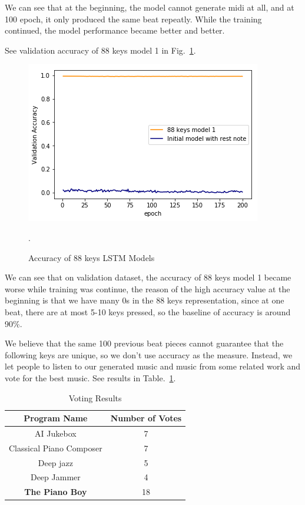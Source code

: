 \documentclass[conference]{IEEEtran}
\begin{document}
We can see that at the beginning, the model cannot generate midi at all, and at 100 epoch, it only produced the same beat repeatly. While the training continued, the model performance became better and better.

See validation accuracy of 88 keys model 1 in Fig.~\ref{fig5}.
\begin{figure}[htbp]
\centerline{\includegraphics[scale=0.5]{pics/compare5.png}}.
\caption{Accuracy of 88 keys LSTM Models}
\label{fig5}
\end{figure}

We can see that on validation dataset, the accuracy of 88 keys model 1 became worse while training was continue, the reason of the high accuracy value at the beginning is that we have many 0s in the 88 keys representation, since at one beat, there are at most 5-10 keys pressed, so the baseline of accuracy is around 90\%.

We believe that the same 100 previous beat pieces cannot guarantee that the following keys are unique, so we don't use accuracy as the measure. Instead, we let people to listen to our generated music and music from some related work and vote for the best music. See results in Table.~\ref{tab1}.

\begin{table}[htbp]
\caption{Voting Results}
\begin{center}
\begin{tabular}{|c|c|}
\hline
Program Name& Number of Votes\\
\hline
AI Jukebox& 7\\
Classical Piano Composer& 7\\
Deep jazz& 5\\
Deep Jammer& 4\\
\textbf{The Piano Boy}& 18\\
\hline
\end{tabular}
\label{tab1}
\end{center}
\end{table}
\end{document}
